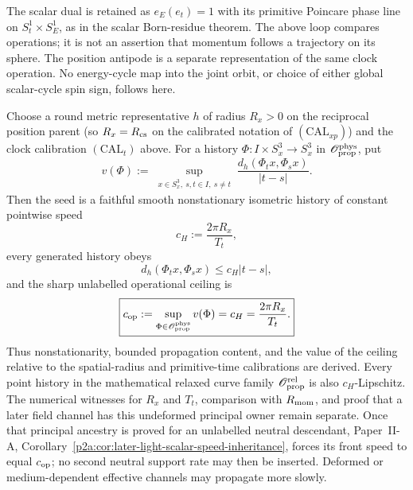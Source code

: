 \documentclass[12pt,a4paper]{article}
\begin{document}
The scalar dual is retained as \(e_E(e_t)=1\) with its primitive
Poincare phase line on \(S_t^1\times S_E^1\), as in the scalar
Born-residue theorem.  The above loop compares operations; it is
not an assertion that momentum follows a trajectory on its sphere.
The position antipode is a separate representation of the same
clock operation.  No energy-cycle map into the joint orbit, or
choice of either global scalar-cycle spin sign, follows here.



\begin{theorem}
\label{p3:thm:gp1-speed-calibration}
Choose a round metric representative \(h\) of radius \(R_x>0\) on the
reciprocal position parent (so \(R_x=R_{\mathrm{cs}}\) on the calibrated notation of
\((\mathrm{CAL}_{xp})\)) and the clock calibration \((\mathrm{CAL}_{t})\) above.
For a history \(\Phi:I\times S^3_x\to S^3_x\) in
\(\mathscr O_{\rm prop}^{\rm phys}\), put
\[
 v(\Phi)
 :=\sup_{\substack{x\in S^3_x,\ s,t\in I,\ s\ne t}}
 \frac{d_h(\Phi_t x,\Phi_s x)}{|t-s|}.
\]
Then the seed is a faithful smooth nonstationary isometric history of constant
pointwise speed
\[
 c_H:=\frac{2\pi R_x}{T_t},
\]
every generated history obeys
\begin{equation}
\label{p3:eq:gp1-calibrated-speed-bound}
 d_h(\Phi_t x,\Phi_s x)\le c_H|t-s|,
\end{equation}
and the sharp unlabelled operational ceiling is
\[
 \boxed{
 c_{\rm op}:=\sup_{\Phi\in\mathscr O_{\rm prop}^{\rm phys}}v(\Phi)
 =c_H=\frac{2\pi R_x}{T_t}.}
\]
Thus nonstationarity, bounded propagation content, and the value of the
ceiling relative to the spatial-radius and primitive-time calibrations are
derived.  Every point history in the mathematical relaxed curve family
\(\mathscr O_{\rm prop}^{\rm rel}\) is also \(c_H\)-Lipschitz.  The numerical witnesses for
\(R_x\) and \(T_t\), comparison with \(R_{\mathrm{mom}}\), and proof that a later field
channel has this undeformed principal owner remain separate.  Once that
principal ancestry is proved for an unlabelled neutral descendant,
Paper~II-A,
Corollary~\ref{p2a:cor:later-light-scalar-speed-inheritance}, forces its
front speed to equal \(c_{\rm op}\); no second neutral support rate may then
be inserted.  Deformed or medium-dependent effective channels may propagate
more slowly.
\end{theorem}
\end{document}
